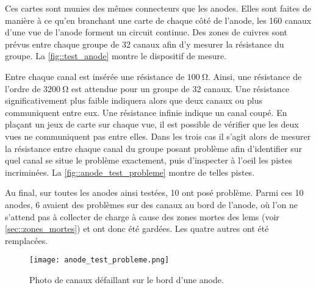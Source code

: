       Ces cartes sont munies des mêmes connecteurs que les anodes. Elles sont faites de manière à ce qu'en branchant une carte de chaque côté de l'anode, les 160 canaux d'une vue de l'anode forment un circuit continue. Des zones de cuivres sont prévus entre chaque groupe de 32 canaux afin d'y mesurer la résistance du groupe. La \autoref{fig::test_anode} montre le dispositif de mesure.

      Entre chaque canal est insérée une résistance de $\SI{100}{\ohm}$. Ainsi, une résistance de l'ordre de $\SI{3200}{\ohm}$ est attendue pour un groupe de 32 canaux. Une résistance significativement plus faible indiquera alors que deux canaux ou plus communiquent entre eux. Une résistance infinie indique un canal coupé. En plaçant un jeux de carte sur chaque vue, il est possible de vérifier que les deux vues ne communiquent pas entre elles. Dans les trois cas il s'agit alors de mesurer la résistance entre chaque canal du groupe posant problème afin d'identifier sur quel canal se situe le problème exactement, puis d'inspecter à l'oeil les pistes incriminées. La \autoref{fig::anode_test_probleme} montre de telles pistes.

      Au final, sur toutes les anodes ainsi testées, 10 ont posé problème. Parmi ces 10 anodes, 6 avaient des problèmes sur des canaux au bord de l'anode, où l'on ne s'attend pas à collecter de charge à cause des zones mortes des \glspl{lem} (voir \autoref{sec::zones_mortes}) et ont donc été gardées. Les quatre autres ont été remplacées.

      \begin{figure}
        \centering
        \texttt{[image: anode\_test\_probleme.png]}
        \caption{\label{fig::anode_test_probleme}Photo de canaux défaillant sur le bord d'une anode.}
      \end{figure}

